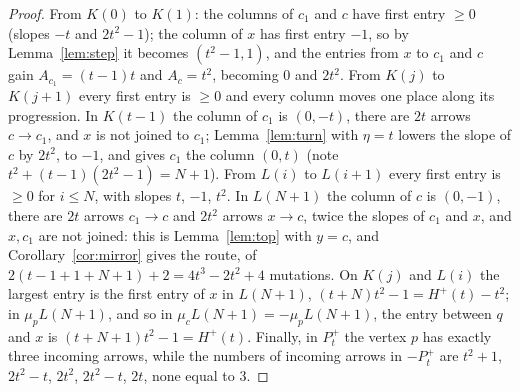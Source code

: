 \documentclass[11pt]{amsart}
\theoremstyle{definition}
\theoremstyle{remark}
\begin{document}
\begin{proof}
From $K(0)$ to $K(1)$: the columns of $c_1$ and $c$ have first entry $\ge0$ (slopes $-t$ and $2t^2-1$); the column of $x$ has first entry $-1$, so by Lemma~\ref{lem:step} it becomes $(t^2-1,1)$, and the entries from $x$ to $c_1$ and $c$ gain $A_{c_1}=(t-1)t$ and $A_c=t^2$, becoming $0$ and $2t^2$. From $K(j)$ to $K(j+1)$ every first entry is $\ge0$ and every column moves one place along its progression. In $K(t-1)$ the column of $c_1$ is $(0,-t)$, there are $2t$ arrows $c\to c_1$, and $x$ is not joined to $c_1$; Lemma~\ref{lem:turn} with $\eta=t$ lowers the slope of $c$ by $2t^2$, to $-1$, and gives $c_1$ the column $(0,t)$ (note $t^2+(t-1)(2t^2-1)=N+1$). From $L(i)$ to $L(i+1)$ every first entry is $\ge0$ for $i\le N$, with slopes $t$, $-1$, $t^2$. In $L(N+1)$ the column of $c$ is $(0,-1)$, there are $2t$ arrows $c_1\to c$ and $2t^2$ arrows $x\to c$, twice the slopes of $c_1$ and $x$, and $x,c_1$ are not joined: this is Lemma~\ref{lem:top} with $y=c$, and Corollary~\ref{cor:mirror} gives the route, of $2(t-1+1+N+1)+2=4t^3-2t^2+4$ mutations. On $K(j)$ and $L(i)$ the largest entry is the first entry of $x$ in $L(N+1)$, $(t+N)t^2-1=H^+(t)-t^2$; in $\mu_pL(N+1)$, and so in $\mu_cL(N+1)=-\mu_pL(N+1)$, the entry between $q$ and $x$ is $(t+N+1)t^2-1=H^+(t)$. Finally, in $P^+_t$ the vertex $p$ has exactly three incoming arrows, while the numbers of incoming arrows in $-P^+_t$ are $t^2+1$, $2t^2-t$, $2t^2$, $2t^2-t$, $2t$, none equal to $3$.
\end{proof}
\end{document}
